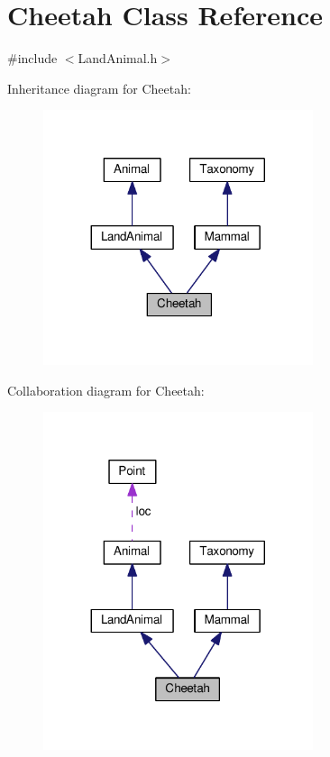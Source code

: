 \hypertarget{classCheetah}{}\section{Cheetah Class Reference}
\label{classCheetah}


{\ttfamily \#include $<$Land\+Animal.\+h$>$}



Inheritance diagram for Cheetah\+:
\nopagebreak
\begin{figure}[H]
\begin{center}
\leavevmode
\includegraphics[width=224pt]{classCheetah__inherit__graph}
\end{center}
\end{figure}


Collaboration diagram for Cheetah\+:
\nopagebreak
\begin{figure}[H]
\begin{center}
\leavevmode
\includegraphics[width=224pt]{classCheetah__coll__graph}
\end{center}
\end{figure}
